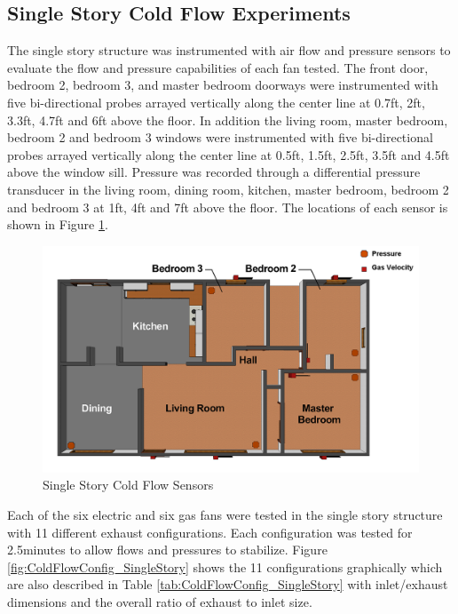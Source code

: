 \documentclass{article}
\begin{document}
\subsection{Single Story Cold Flow Experiments}
The single story structure was instrumented with air flow and pressure sensors to evaluate the flow and pressure capabilities of each fan tested. The front door, bedroom 2, bedroom 3, and master bedroom doorways were instrumented with five bi-directional probes arrayed vertically along the center line at 0.7ft, 2ft, 3.3ft, 4.7ft and 6ft above the floor. In addition the living room, master bedroom, bedroom 2 and bedroom 3 windows were instrumented with five bi-directional probes arrayed vertically along the center line at 0.5ft, 1.5ft, 2.5ft, 3.5ft and 4.5ft above the window sill. Pressure was recorded through a differential pressure transducer in the living room, dining room, kitchen, master bedroom, bedroom 2 and bedroom 3 at 1ft, 4ft and 7ft above the floor. The locations of each sensor is shown in Figure \ref{fig:SingleStoryColdFlowSensors}. 

\begin{figure} [H]
	\centering
	\includegraphics[width = 5in]{0_Images/ColdFlow/SingleStory_Sensors.png}
	\caption{Single Story Cold Flow Sensors}
	\label{fig:SingleStoryColdFlowSensors}
\end{figure}

Each of the six electric and six gas fans were tested in the single story structure with 11 different exhaust configurations. Each configuration was tested for 2.5minutes to allow flows and pressures to stabilize. Figure \ref{fig:ColdFlowConfig_SingleStory} shows the 11 configurations graphically which are also described in Table \ref{tab:ColdFlowConfig_SingleStory} with inlet/exhaust dimensions and the overall ratio of exhaust to inlet size. 
\end{document}
